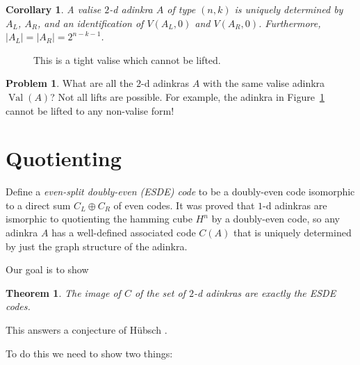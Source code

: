 \documentclass[12pt,twoside,singlespace]{article}
\numberwithin{equation}{section}
\newtheorem{thm}[equation]{Theorem}
\newtheorem{cor}[equation]{Corollary}
\theoremstyle{definition}
\newtheorem{prob}{Problem}
\newcommand{\on}{\operatorname}
\newcommand{\val}{\on{Val}}
\begin{document}
\begin{cor}
\label{cor:valise factorization}
A valise $2$-d adinkra $A$ of type $(n,k)$ is uniquely determined by $A_L$, $A_R$, and an identification of $V(A_L, 0)$ and $V(A_R, 0)$. Furthermore, $|A_L| = |A_R| = 2^{n-k-1}$.
\end{cor}



\begin{figure}[htb]
\begin{center}

\caption{This is a tight valise which cannot be lifted.\label{fig:tight valise}}
\end{center}
\end{figure}

\begin{prob}
What are all the $2$-d adinkras $A$ with the same valise adinkra $\val(A)$? Not all lifts are possible. For example, the adinkra in Figure~\ref{fig:tight valise} cannot be lifted to any non-valise form!
\end{prob}

\section{Quotienting}

Define a \emph{even-split doubly-even (ESDE) code} to be a doubly-even code isomorphic to a direct sum $C_L \oplus C_R$ of even codes. It was proved \cite{blah} that $1$-d adinkras are ismorphic to quotienting the hamming cube $H^n$ by a doubly-even code, so any adinkra $A$ has a well-defined associated code $C(A)$ that is uniquely determined by just the graph structure of the adinkra.

Our goal is to show
\begin{thm}
The image of $C$ of the set of $2$-d adinkras are exactly the ESDE codes.
\end{thm}

This answers a conjecture of H\"{u}bsch \cite{}.

To do this we need to show two things:
\end{document}
